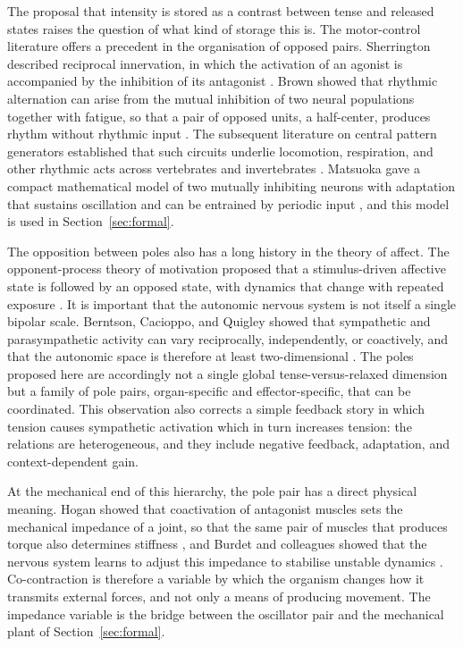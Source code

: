\documentclass[11pt]{article}
\theoremstyle{plain}
\theoremstyle{definition}
\begin{document}
The proposal that intensity is stored as a contrast between tense and released states raises the question of what kind of storage this is. The motor-control literature offers a precedent in the organisation of opposed pairs. Sherrington described reciprocal innervation, in which the activation of an agonist is accompanied by the inhibition of its antagonist \citep{sherrington1906}. Brown showed that rhythmic alternation can arise from the mutual inhibition of two neural populations together with fatigue, so that a pair of opposed units, a half-center, produces rhythm without rhythmic input \citep{brown1911}. The subsequent literature on central pattern generators established that such circuits underlie locomotion, respiration, and other rhythmic acts across vertebrates and invertebrates \citep{grillner1985,marder2001}. Matsuoka gave a compact mathematical model of two mutually inhibiting neurons with adaptation that sustains oscillation and can be entrained by periodic input \citep{matsuoka1985}, and this model is used in Section~\ref{sec:formal}.

The opposition between poles also has a long history in the theory of affect. The opponent-process theory of motivation proposed that a stimulus-driven affective state is followed by an opposed state, with dynamics that change with repeated exposure \citep{solomon1974}. It is important that the autonomic nervous system is not itself a single bipolar scale. Berntson, Cacioppo, and Quigley showed that sympathetic and parasympathetic activity can vary reciprocally, independently, or coactively, and that the autonomic space is therefore at least two-dimensional \citep{berntson1991}. The poles proposed here are accordingly not a single global tense-versus-relaxed dimension but a family of pole pairs, organ-specific and effector-specific, that can be coordinated. This observation also corrects a simple feedback story in which tension causes sympathetic activation which in turn increases tension: the relations are heterogeneous, and they include negative feedback, adaptation, and context-dependent gain.

At the mechanical end of this hierarchy, the pole pair has a direct physical meaning. Hogan showed that coactivation of antagonist muscles sets the mechanical impedance of a joint, so that the same pair of muscles that produces torque also determines stiffness \citep{hogan1984}, and Burdet and colleagues showed that the nervous system learns to adjust this impedance to stabilise unstable dynamics \citep{burdet2001}. Co-contraction is therefore a variable by which the organism changes how it transmits external forces, and not only a means of producing movement. The impedance variable is the bridge between the oscillator pair and the mechanical plant of Section~\ref{sec:formal}.
\end{document}
